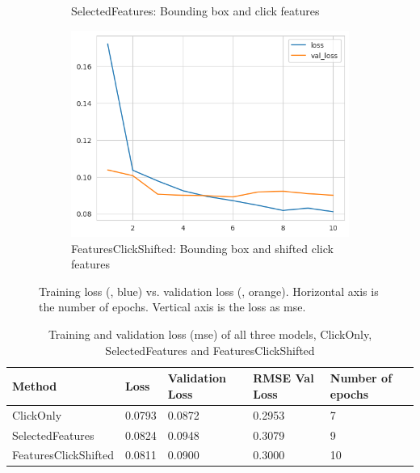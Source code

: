 \begin{figure}[htbp!]
\begin{subfigure}[b]{0.45\textwidth}
    \caption{SelectedFeatures: Bounding box and click features}
    \label{fig:model_history_loss_features}
  \end{subfigure}
  \hfill
  \begin{subfigure}[b]{0.8\textwidth}
    \centering
    \includegraphics[width=\textwidth]{graphics/model_history_loss_features_shifted}
    \caption{FeaturesClickShifted: Bounding box and shifted click features}
    \label{fig:model_history_loss_features_shifted}
  \end{subfigure}
  \caption[Training loss vs. validation loss]{Training loss (, blue) vs. validation loss (, orange). Horizontal axis is the number of epochs. Vertical axis is the loss as \gls{mse}.}
  \label{fig:model_history_losses}
\end{figure}

\begin{table}[htbp!]
  \small
  \centering
  \begin{tabular}{|l|l|l|l|l|}
    \hline
    \textbf{Method}      & \textbf{Loss} & \textbf{Validation Loss} & \textbf{RMSE Val Loss}   & \textbf{Number of epochs} \\
    \hline
    ClickOnly            & 0.0793        & 0.0872                   & 0.2953                   & 7                         \\
    SelectedFeatures     & 0.0824        & 0.0948                   & 0.3079                   & 9                         \\
    FeaturesClickShifted & 0.0811        & 0.0900                   & 0.3000                   & 10                        \\
    \hline
  \end{tabular}
  \caption[Training and validation loss, number of epochs]{Training and validation loss (\gls{mse}) of all three models, ClickOnly, SelectedFeatures and FeaturesClickShifted}
  \label{tab:model_losses}
\end{table}

